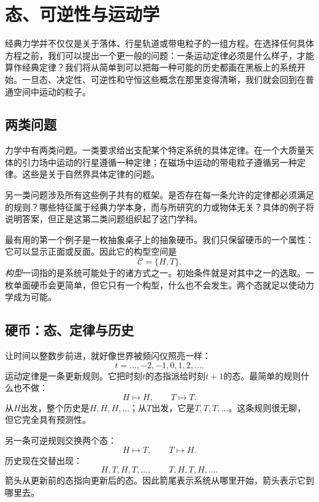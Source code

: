 \chapter{态、可逆性与运动学}

经典力学并不仅仅是关于落体、行星轨道或带电粒子的一组方程。在选择任何具体方程之前，我们可以提出一个更一般的问题：一条运动定律必须是什么样子，才能算作经典定律？我们将从简单到可以把每一种可能的历史都画在黑板上的系统开始。一旦态、决定性、可逆性和守恒这些概念在那里变得清晰，我们就会回到在普通空间中运动的粒子。

\section{两类问题}

力学中有两类问题。一类要求给出支配某个特定系统的具体定律。在一个大质量天体的引力场中运动的行星遵循一种定律；在磁场中运动的带电粒子遵循另一种定律。这些是关于自然界具体定律的问题。

另一类问题涉及所有这些例子共有的框架。是否存在每一条允许的定律都必须满足的规则？哪些特征属于经典力学本身，而与所研究的力或物体无关？具体的例子将说明答案，但正是这第二类问题组织起了这门学科。

最有用的第一个例子是一枚抽象桌子上的抽象硬币。我们只保留硬币的一个属性：它可以显示正面或反面。因此它的构型空间是
\begin{equation}
  \mathcal C=\{H,T\}.
\end{equation}
\emph{构型}一词指的是系统可能处于的诸方式之一。初始条件就是对其中之一的选取。一枚单面硬币会更简单，但它只有一个构型，什么也不会发生。两个态就足以使动力学成为可能。

\section{硬币：态、定律与历史}

让时间以整数步前进，就好像世界被频闪仪照亮一样：
\begin{equation}
  t=\ldots,-2,-1,0,1,2,\ldots .
\end{equation}
运动定律是一条更新规则。它把时刻\(t\)的态指派给时刻\(t+1\)的态。最简单的规则什么也不做：
\begin{equation}
  H\longmapsto H,
  \qquad
  T\longmapsto T.
  \label{eq:coin-identity}
\end{equation}
从\(H\)出发，整个历史是\(H,H,H,\ldots\)；从\(T\)出发，它是\(T,T,T,\ldots\)。这条规则很无聊，但它完全具有预测性。

另一条可逆规则交换两个态：
\begin{equation}
  H\longmapsto T,
  \qquad
  T\longmapsto H.
  \label{eq:coin-flip}
\end{equation}
历史现在交替出现：
\begin{equation}
  H,T,H,T,\ldots,
  \qquad
  T,H,T,H,\ldots .
\end{equation}
箭头从更新前的态指向更新后的态。因此箭尾表示系统从哪里开始，箭头表示它到哪里去。

